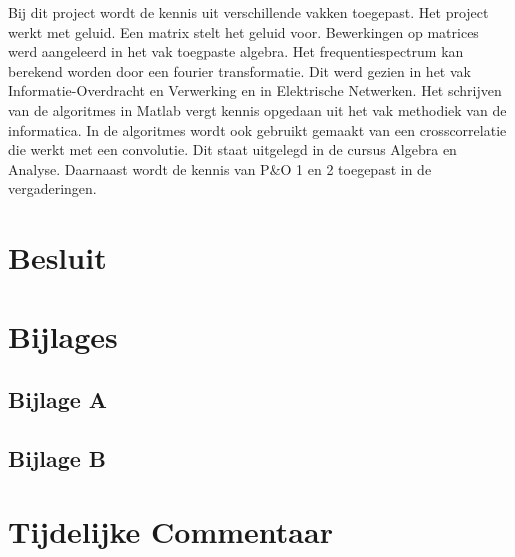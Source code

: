 \documentclass[12pt]{report}
\begin{document}
Bij dit project wordt de kennis uit verschillende vakken toegepast. Het project werkt met geluid. Een matrix stelt het geluid voor. Bewerkingen op matrices werd aangeleerd in het vak toegpaste algebra. Het frequentiespectrum kan berekend worden door een fourier transformatie. Dit werd gezien in het vak Informatie-Overdracht en Verwerking en in Elektrische Netwerken. Het schrijven van de algoritmes in Matlab vergt kennis opgedaan uit het vak methodiek van de informatica. In de algoritmes wordt ook gebruikt gemaakt van een crosscorrelatie die werkt met een convolutie. Dit staat uitgelegd in de cursus Algebra en Analyse. Daarnaast wordt de kennis van P\&O 1 en 2 toegepast in de vergaderingen. 

\chapter*{Besluit}







\chapter*{Bijlages}
\section{Bijlage A}
\label{sec:bijlageA}

\section{Bijlage B}




\chapter{Tijdelijke Commentaar}
\end{document}
